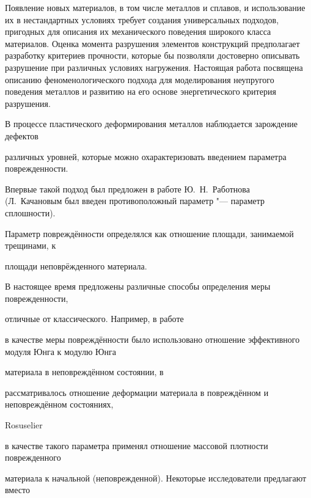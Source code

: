 




\makerutitle






Появление новых материалов, в том числе металлов и сплавов, и использование их в нестандартных условиях требует создания универсальных подходов, пригодных для описания их механического поведения широкого класса материалов. Оценка момента разрушения элементов конструкций предполагает разработку критериев прочности, которые бы позволяли достоверно описывать разрушение при различных условиях нагружения. Настоящая работа посвящена описанию феноменологического подхода для моделирования неупругого поведения металлов и развитию на его основе энергетического критерия разрушения.



В процессе пластического деформирования металлов наблюдается зарождение дефектов

различных уровней, которые можно охарактеризовать введением параметра поврежденности.

Впервые такой подход был предложен в работе Ю.~Н.~Работнова~\cite{kostina:bib:Rabotnov} (Л.~Качановым \cite{kostina:bib:Kachanov} был введен противоположный параметр "--- параметр сплошности).

Параметр повреждённости определялся как отношение площади, занимаемой трещинами, к

площади неповрёжденного материала.

В настоящее время предложены различные способы определения меры поврежденности,

отличные от классического. Например, в работе~\cite{kostina:bib:LemDes}

в качестве меры повреждённости было использовано отношение эффективного модуля Юнга к модулю Юнга

материала в неповреждённом состоянии, в \cite{kostina:bib:PiechPach}

рассматривалось отношение деформации материала в повреждённом и неповреждённом состояниях,

Rosuselier 

в качестве такого параметра применял отношение массовой плотности поврежденного

материала к начальной (неповрежденной). Некоторые исследователи предлагают вместо

